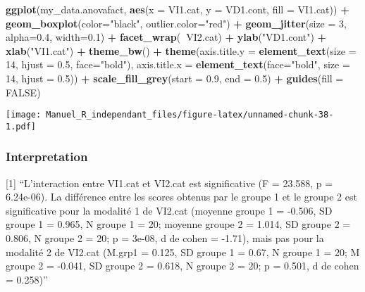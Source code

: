 \documentclass[
]{book}
\newenvironment{Shaded}{\begin{snugshade}}{\end{snugshade}}
\newcommand{\DataTypeTok}[1]{\textcolor[rgb]{0.13,0.29,0.53}{#1}}
\newcommand{\DecValTok}[1]{\textcolor[rgb]{0.00,0.00,0.81}{#1}}
\newcommand{\FloatTok}[1]{\textcolor[rgb]{0.00,0.00,0.81}{#1}}
\newcommand{\KeywordTok}[1]{\textcolor[rgb]{0.13,0.29,0.53}{\textbf{#1}}}
\newcommand{\NormalTok}[1]{#1}
\newcommand{\OperatorTok}[1]{\textcolor[rgb]{0.81,0.36,0.00}{\textbf{#1}}}
\newcommand{\OtherTok}[1]{\textcolor[rgb]{0.56,0.35,0.01}{#1}}
\newcommand{\StringTok}[1]{\textcolor[rgb]{0.31,0.60,0.02}{#1}}
\begin{document}
\begin{Shaded}
\begin{Highlighting}[]
\KeywordTok{ggplot}\NormalTok{(my_data.anovafact, }\KeywordTok{aes}\NormalTok{(}\DataTypeTok{x =}\NormalTok{ VI1.cat, }\DataTypeTok{y =}\NormalTok{ VD1.cont, }\DataTypeTok{fill =}\NormalTok{ VI1.cat)) }\OperatorTok{+}
\StringTok{  }\KeywordTok{geom_boxplot}\NormalTok{(}\DataTypeTok{color=}\StringTok{"black"}\NormalTok{, }\DataTypeTok{outlier.color=}\StringTok{"red"}\NormalTok{) }\OperatorTok{+}\StringTok{ }
\StringTok{  }\KeywordTok{geom_jitter}\NormalTok{(}\DataTypeTok{size =} \DecValTok{3}\NormalTok{, }\DataTypeTok{alpha=}\FloatTok{0.4}\NormalTok{, }\DataTypeTok{width=}\FloatTok{0.1}\NormalTok{) }\OperatorTok{+}
\StringTok{  }\KeywordTok{facet_wrap}\NormalTok{(}\OperatorTok{~}\NormalTok{VI2.cat) }\OperatorTok{+}
\StringTok{  }\KeywordTok{ylab}\NormalTok{(}\StringTok{"VD1.cont"}\NormalTok{) }\OperatorTok{+}\StringTok{ }\KeywordTok{xlab}\NormalTok{(}\StringTok{"VI1.cat"}\NormalTok{) }\OperatorTok{+}\StringTok{ }
\StringTok{  }\KeywordTok{theme_bw}\NormalTok{() }\OperatorTok{+}\StringTok{ }
\StringTok{  }\KeywordTok{theme}\NormalTok{(}\DataTypeTok{axis.title.y =} \KeywordTok{element_text}\NormalTok{(}\DataTypeTok{size =} \DecValTok{14}\NormalTok{, }\DataTypeTok{hjust =} \FloatTok{0.5}\NormalTok{, }\DataTypeTok{face=}\StringTok{"bold"}\NormalTok{), }
        \DataTypeTok{axis.title.x =} \KeywordTok{element_text}\NormalTok{(}\DataTypeTok{face=}\StringTok{"bold"}\NormalTok{, }\DataTypeTok{size =} \DecValTok{14}\NormalTok{, }\DataTypeTok{hjust =} \FloatTok{0.5}\NormalTok{)) }\OperatorTok{+}\StringTok{ }
\StringTok{  }\KeywordTok{scale_fill_grey}\NormalTok{(}\DataTypeTok{start =} \FloatTok{0.9}\NormalTok{, }\DataTypeTok{end =} \FloatTok{0.5}\NormalTok{) }\OperatorTok{+}
\StringTok{  }\KeywordTok{guides}\NormalTok{(}\DataTypeTok{fill =} \OtherTok{FALSE}\NormalTok{)}
\end{Highlighting}
\end{Shaded}

\texttt{[image: Manuel\_R\_independant\_files/figure-latex/unnamed-chunk-38-1.pdf]}

\hypertarget{interpretation-3}{%
\subsubsection{Interpretation}\label{interpretation-3}}

{[}1{]} ``L'interaction entre VI1.cat et VI2.cat est significative (F = 23.588, p = 6.24e-06). La différence entre les scores obtenus par le groupe 1 et le groupe 2 est significative pour la modalité 1 de VI2.cat (moyenne groupe 1 = -0.506, SD groupe 1 = 0.965, N groupe 1 = 20; moyenne groupe 2 = 1.014, SD groupe 2 = 0.806, N groupe 2 = 20; p = 3e-08, d de cohen = -1.71), mais pas pour la modalité 2 de VI2.cat (M.grp1 = 0.125, SD groupe 1 = 0.67, N groupe 1 = 20; M groupe 2 = -0.041, SD groupe 2 = 0.618, N groupe 2 = 20; p = 0.501, d de cohen = 0.258)''
\end{document}
